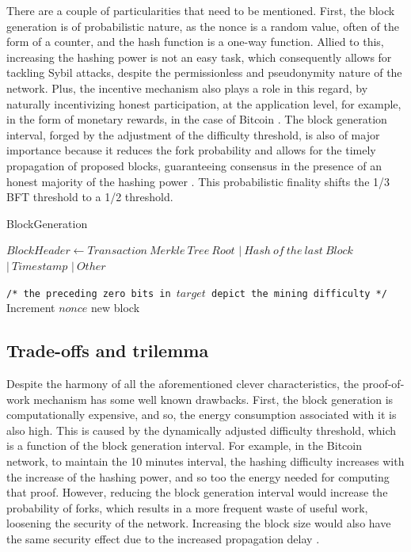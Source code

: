 \documentclass[journal]{IEEEtran}
\newcommand{\LineComment}[1]{\State \texttt{/* #1 */}}
\begin{document}
There are a couple of particularities that need to be mentioned. First, the block generation
is of probabilistic nature, as the nonce is a random value, often of the form of a counter, 
and the hash function is a one-way function.
Allied to this, increasing the hashing power is not an easy task, which consequently allows for tackling Sybil attacks,
despite the permissionless and pseudonymity nature of the network. Plus, the incentive mechanism
also plays a role in this regard, by naturally incentivizing honest participation, at the application level, 
for example, in the form of monetary rewards, in the case of Bitcoin \cite{nakamoto2008bitcoin}.
The block generation interval, forged by the adjustment of the difficulty
threshold, is also of major importance because it reduces the fork probability and
allows for the timely propagation of proposed blocks, guaranteeing consensus
in the presence of an honest majority of the hashing power \cite{garay2015bitcoin, natoli2019deconstructing}.
This probabilistic finality shifts the 1/3 BFT threshold to a 1/2 threshold.

\begin{algorithm}
  \caption[short]{BlockGeneration}\label{alg:BlockGeneration}
  \begin{algorithmic}[1]
    \Function {}{}
      \State $Block Header \gets Transaction \ Merkle \ Tree \ Root$
      \Indent
        \State $| \ Hash \ of \ the \ last \ Block$
        \State $| \ Timestamp$
        \State $| \ Other$
      \EndIndent
      
      \LineComment{the preceding zero bits in $target$ depict the mining difficulty}
      \State Increment $nonce$
      \EndWhile
      \State \Return new block
    \EndFunction
  \end{algorithmic}
\end{algorithm}

\subsection{Trade-offs and trilemma}

Despite the harmony of all the aforementioned clever characteristics,
the proof-of-work mechanism has some well known drawbacks. 
First, the block generation is computationally expensive, and so, the
energy consumption associated with it is also high. This is caused by the
dynamically adjusted difficulty threshold, which is a function of the block 
generation interval. For example, in the Bitcoin network, to maintain the 10 
minutes interval, the hashing difficulty
increases with the increase of the hashing power, and so too the energy needed for computing that proof. 
However, reducing the block generation interval would increase the
probability of forks, which results in a more frequent waste of useful work,
loosening the security of the network. Increasing the block size would also
have the same security effect due to the increased propagation delay \cite{8629877, natoli2019deconstructing}.
\end{document}
